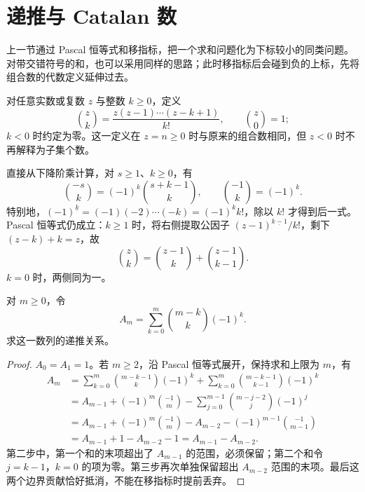 \documentclass[lang=cn,a4paper,fontset=none,zihao=false,10pt,openany,twoside]{beautybook}
\numberwithin{algorithm}{chapter}
\begin{document}
\section{递推与 Catalan 数}\label{sec:recurrences-catalan}
上一节通过 Pascal 恒等式和移指标，把一个求和问题化为下标较小的同类问题。对带交错符号的和，也可以采用同样的思路；此时移指标后会碰到负的上标，先将组合数的代数定义延伸过去。
\begin{definition}[广义组合数]
对任意实数或复数 $z$ 与整数 $k\ge0$，定义
\[
 \binom zk=\frac{z(z-1)\cdots(z-k+1)}{k!},\qquad
 \binom z0=1;
\]
$k<0$ 时约定为零。这一定义在 $z=n\ge0$ 时与原来的组合数相同，但 $z<0$ 时不再解释为子集个数。
\end{definition}
直接从下降阶乘计算，对 $s\ge1$、$k\ge0$，有
\[
 \binom{-s}k=(-1)^k\binom{s+k-1}k,
 \qquad\binom{-1}k=(-1)^k.
\]
特别地，$(-1)^{\underline k}=(-1)(-2)\cdots(-k)=(-1)^k k!$，除以 $k!$ 才得到后一式。Pascal 恒等式仍成立：$k\ge1$ 时，将右侧提取公因子 $(z-1)^{\underline{k-1}}/k!$，剩下 $(z-k)+k=z$，故
\[
 \binom zk=\binom{z-1}k+\binom{z-1}{k-1}.
\]
$k=0$ 时，两侧同为一。

\begin{example}[交错和的递推]\label{ex:alternating-binomial-recurrence}
对 $m\ge0$，令
\[
 A_m=\sum_{k=0}^m\binom{m-k}k(-1)^k.
\]
求这一数列的递推关系。
\end{example}
\begin{proof}
$A_0=A_1=1$。若 $m\ge2$，沿 Pascal 恒等式展开，保持求和上限为 $m$，有
\[
 \begin{aligned}
 A_m
 &=\sum_{k=0}^m\binom{m-k-1}k(-1)^k
  +\sum_{k=0}^m\binom{m-k-1}{k-1}(-1)^k\\
 &=A_{m-1}+(-1)^m\binom{-1}m
   -\sum_{j=0}^{m-1}\binom{m-j-2}j(-1)^j\\
 &=A_{m-1}+(-1)^m\binom{-1}m
   -A_{m-2}-(-1)^{m-1}\binom{-1}{m-1}\\
 &=A_{m-1}+1-A_{m-2}-1
 =A_{m-1}-A_{m-2}.
 \end{aligned}
\]
第二步中，第一个和的末项超出了 $A_{m-1}$ 的范围，必须保留；第二个和令 $j=k-1$，$k=0$ 的项为零。第三步再次单独保留超出 $A_{m-2}$ 范围的末项。最后这两个边界贡献恰好抵消，不能在移指标时提前丢弃。
\end{proof}
\end{document}

